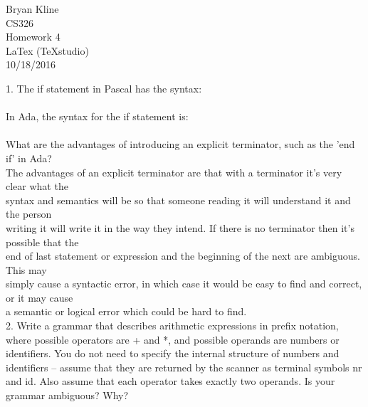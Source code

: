 \documentclass[12pt]{article}
\begin{document}
\begin{center}

\Huge
Bryan Kline\\
[10mm]
CS326\\ 
[10mm]
Homework 4\\
\small LaTex (TeXstudio)\\
[10mm]
\Huge
10/18/2016\\
[200mm]

\end{center}

\begin{flushleft}

1. The if statement in Pascal has the syntax:\\
[2mm]

\\
[2mm]

In Ada, the syntax for the if statement is:\\
[2mm]

\\
[2mm]

What are the advantages of introducing an explicit terminator, such as the 'end if' in Ada?\\
[2mm]

\qquad The advantages of an explicit terminator are that with a terminator it's very clear what the\\ 
\qquad syntax and semantics will be so that someone reading it will understand it and the person\\ 
\qquad writing it will write it in the way they intend.  If there is no terminator then it's possible that the\\
\qquad end of last statement or expression and the beginning of the next are ambiguous.  This may\\
\qquad simply cause a syntactic error, in which case it would be easy to find and correct, or it may cause\\
\qquad a semantic or logical error which could be hard to find.\\
[6mm]

2. Write a grammar that describes arithmetic expressions in prefix notation, where
possible operators are + and *, and possible operands are numbers or identifiers. You do not
need to specify the internal structure of numbers and identifiers – assume that they are
returned by the scanner as terminal symbols nr and id. Also assume that each operator
takes exactly two operands. Is your grammar ambiguous? Why?\\
[2mm]


\end{flushleft}
\end{document}
